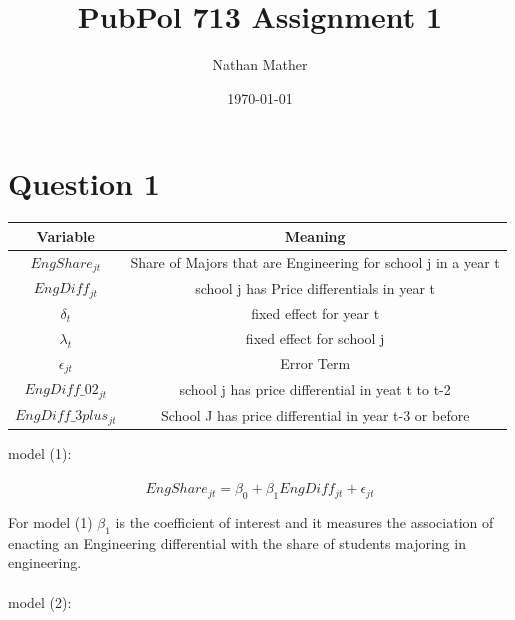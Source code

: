 \documentclass[11pt]{article}
\title{PubPol 713 Assignment 1} %
\author{Nathan Mather} %
\date{\today} %
\begin{document}
	
\maketitle %

\setcounter{tocdepth}{2} %


\section{ Question 1}

\begin{center}
	\begin{tabular}{||c | c||} 
		\hline
		Variable & Meaning  \\ [0.5ex] 
		\hline\hline
		$EngShare_{jt}$ & Share of Majors that are Engineering for school j in a year t \\ 		
		\hline 
		$EngDiff_{jt}$ & school j has Price differentials in year t\\ 
		\hline
		$\delta_t$ & fixed effect for year t \\ 
		\hline
		$\lambda_t$ &  fixed effect for school j\\
		\hline
		$\epsilon_{jt}$ & Error Term \\
		\hline
		$EngDiff\_02_{jt}$ & school j has price differential in yeat t to t-2 \\
		\hline
		$EngDiff\_3plus_{jt}$ & School J has price differential in year t-3 or before \\[1ex] 
		\hline
	\end{tabular}
\end{center}


model (1):  \\ \\ 

$$
EngShare_{jt} = \beta_0 +  \beta_1  EngDiff_{jt} + \epsilon_{jt}  $$

For model (1) $\beta_1$ is the coefficient of interest and it measures the association of enacting an Engineering differential with the share of students majoring in engineering. 
\\ \\ 
model (2): \\ \\ 
\end{document}
